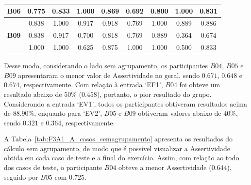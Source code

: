 \begin{table}[htbp]
\begin{tabular}{|ccccccccc|}
		\multicolumn{1}{|c|}{\textbf{B06}} & \multicolumn{1}{c|}{0.775} & \multicolumn{1}{c|}{0.833} & \multicolumn{1}{c|}{1.000} & \multicolumn{1}{c|}{0.869} & \multicolumn{1}{c|}{0.692} & \multicolumn{1}{c|}{0.800} & \multicolumn{1}{c|}{1.000} & 0.831 \\ \hline
		\rowcolor[HTML]{F2F2F2} 
		\multicolumn{1}{|c|}{\cellcolor[HTML]{F2F2F2}\textbf{B08}} & \multicolumn{1}{c|}{\cellcolor[HTML]{F2F2F2}0.838} & \multicolumn{1}{c|}{\cellcolor[HTML]{F2F2F2}1.000} & \multicolumn{1}{c|}{\cellcolor[HTML]{F2F2F2}0.917} & \multicolumn{1}{c|}{\cellcolor[HTML]{F2F2F2}0.918} & \multicolumn{1}{c|}{\cellcolor[HTML]{F2F2F2}0.769} & \multicolumn{1}{c|}{\cellcolor[HTML]{F2F2F2}1.000} & \multicolumn{1}{c|}{\cellcolor[HTML]{F2F2F2}0.889} & 0.886 \\ \hline
		\multicolumn{1}{|c|}{\textbf{B09}} & \multicolumn{1}{c|}{0.838} & \multicolumn{1}{c|}{0.917} & \multicolumn{1}{c|}{0.700} & \multicolumn{1}{c|}{0.818} & \multicolumn{1}{c|}{0.769} & \multicolumn{1}{c|}{0.889} & \multicolumn{1}{c|}{0.364} & 0.674 \\ \hline
		\rowcolor[HTML]{F2F2F2} 
		\multicolumn{1}{|c|}{\cellcolor[HTML]{F2F2F2}\textbf{B10}} & \multicolumn{1}{c|}{\cellcolor[HTML]{F2F2F2}1.000} & \multicolumn{1}{c|}{\cellcolor[HTML]{F2F2F2}1.000} & \multicolumn{1}{c|}{\cellcolor[HTML]{F2F2F2}0.625} & \multicolumn{1}{c|}{\cellcolor[HTML]{F2F2F2}0.875} & \multicolumn{1}{c|}{\cellcolor[HTML]{F2F2F2}1.000} & \multicolumn{1}{c|}{\cellcolor[HTML]{F2F2F2}1.000} & \multicolumn{1}{c|}{\cellcolor[HTML]{F2F2F2}0.500} & 0.833 \\ \hline
	\end{tabular}
	\label{tab:F3A1_A_entradas}
\end{table}

Desse modo, considerando o lado sem agrupamento, os participantes $B04$, $B05$ e $B09$ apresentaram o menor valor de Assertividade no geral, sendo $0.671$, $0.648$ e $0.674$, respectivamente.  Com relação à entrada `EF1', $B04$ foi obteve um resultado abaixo de $50\%$ ($0.458$), portanto, o pior resultado do grupo. Considerando a entrada `EV1', todos os participantes obtiveram resultados acima de $88.90\%$, enquanto para `EV2', $B05$ e $B09$ obtiveram valores abaixo de $40\%$, sendo $0.321$ e $0.364$, respectivamente.

A Tabela~\ref{tab:F3A1_A_casos_semagrupamento} apresenta os resultados do cálculo sem agrupamento, de modo que é possível visualizar a Assertividade obtida em cada caso de teste e a final do exercício. Assim, com relação ao todo dos casos de teste, o participante $B04$ obteve a menor Assertividade ($0.644$), seguido por $B05$ com $0.725$.

